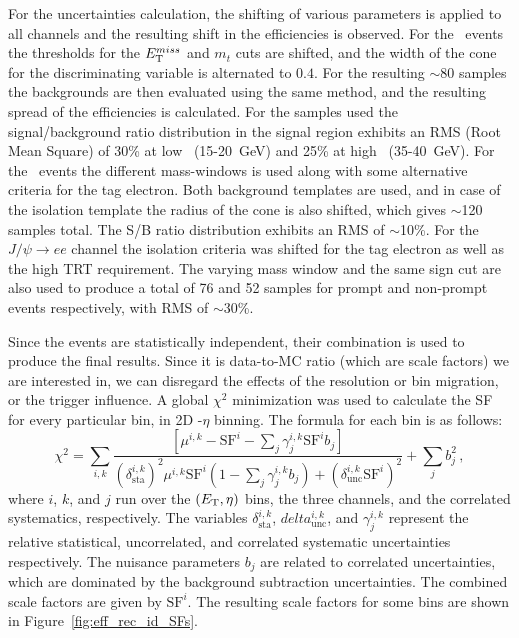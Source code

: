 For the uncertainties calculation, the shifting of various parameters is applied to all channels and the resulting shift in the efficiencies is observed. For the \Wenu\ events the thresholds for the $E_{\mathrm{T}}^{miss}$ and $m_{t}$ cuts are shifted, and the width of the cone for the discriminating variable is alternated to $0.4$. For the resulting $\sim$80 samples the backgrounds are then evaluated using the same method, and the resulting spread of the efficiencies is calculated. For the samples used the signal/background ratio distribution in the signal region exhibits an RMS (Root Mean Square) of 30\% at low \et\ (15-20~GeV) and 25\% at high \et\ (35-40~GeV). For the \Zee\ events the different mass-windows is used along with some alternative criteria for the tag electron. Both background templates are used, and in case of the isolation template the radius of the cone is also shifted, which gives $\sim$120 samples total. The S/B ratio distribution exhibits an RMS of $\sim$10\%. For the $J/\psi \to ee$ channel the isolation criteria was shifted for the tag electron as well as the high TRT requirement. The varying mass window and the same sign cut are also used to produce a total of 76 and 52 samples for prompt and non-prompt events respectively, with RMS of $\sim$30\%.

Since the events are statistically independent, their combination is used to produce the final results. Since it is data-to-MC ratio (which are scale factors) we are interested in, we can disregard the effects of the resolution or bin migration, or the trigger influence. A global $\chi^{2}$ minimization was used to calculate the SF for every particular bin, in 2D \pt-$\eta$ binning. The formula for each bin is as follows:
\begin{equation}
\chi^{2} = \sum_{i,k} \frac{\left[ \mu^{i,k} - \mathrm{SF}^{i} - \sum_{j} \gamma_{j}^{i,k}\mathrm{SF}^{i}b_{j} \right]}
  {\left( \delta^{i,k}_{\mathrm{sta}} \right)^{2} \mu^{i,k}\mathrm{SF}^{i} \left( 1 - \sum_{j} \gamma_{j}^{i,k}b_{j} \right) + \left(\delta^{i,k}_{\mathrm{unc}} \mathrm{SF}^{i} \right)^{2}}
  + \sum_{j} b_{j}^{2} \,,
\end{equation}
where $i$, $k$, and $j$ run  over  the  $(E_{\mathrm{T}}, \eta)$ bins, the three channels, and the correlated systematics, respectively. The variables $\delta^{i,k}_{\mathrm{sta}}$, $delta^{i,k}_{\mathrm{unc}}$, and $\gamma_{j}^{i,k}$ represent the relative statistical, uncorrelated, and correlated systematic uncertainties respectively. The nuisance parameters $b_{j}$ are  related  to  correlated  uncertainties,  which are  dominated  by  the  background subtraction uncertainties. The combined scale factors are given by $\mathrm{SF}^{i}$. The resulting scale factors for some bins are shown in Figure~\ref{fig:eff_rec_id_SFs}.


